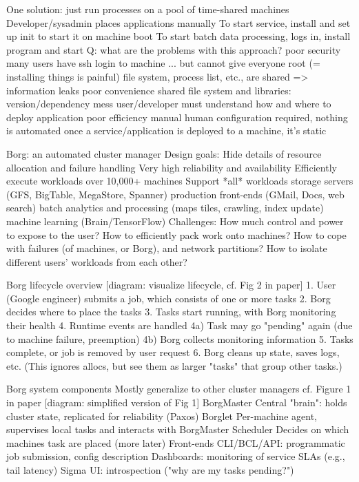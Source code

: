 One solution: just run processes on a pool of time-shared machines
  Developer/sysadmin places applications manually
    To start service, install and set up init to start it on machine boot
    To start batch data processing, logs in, install program and start
  Q: what are the problems with this approach?
    poor security
      many users have ssh login to machine
      ... but cannot give everyone root (= installing things is painful)
      file system, process list, etc., are shared => information leaks
    poor convenience
      shared file system and libraries: version/dependency mess
      user/developer must understand how and where to deploy application
    poor efficiency
      manual human configuration required, nothing is automated
      once a service/application is deployed to a machine, it's static

Borg: an automated cluster manager
  Design goals:
    Hide details of resource allocation and failure handling
    Very high reliability and availability
    Efficiently execute workloads over 10,000+ machines
    Support *all* workloads
      storage servers (GFS, BigTable, MegaStore, Spanner)
      production front-ends (GMail, Docs, web search)
      batch analytics and processing (maps tiles, crawling, index update)
      machine learning (Brain/TensorFlow)
  Challenges:
    How much control and power to expose to the user?
    How to efficiently pack work onto machines?
    How to cope with failures (of machines, or Borg), and network partitions?
    How to isolate different users' workloads from each other?

Borg lifecycle overview
  [diagram: visualize lifecycle, cf. Fig 2 in paper]
  1. User (Google engineer) submits a job, which consists of one or more tasks
  2. Borg decides where to place the tasks
  3. Tasks start running, with Borg monitoring their health
  4. Runtime events are handled
    4a) Task may go "pending" again (due to machine failure, preemption)
    4b) Borg collects monitoring information
  5. Tasks complete, or job is removed by user request
  6. Borg cleans up state, saves logs, etc.
  (This ignores allocs, but see them as larger "tasks" that group other tasks.)

Borg system components
  Mostly generalize to other cluster managers
  cf. Figure 1 in paper
  [diagram: simplified version of Fig 1]
  BorgMaster
    Central "brain": holds cluster state, replicated for reliability (Paxos)
  Borglet
    Per-machine agent, supervises local tasks and interacts with BorgMaster
  Scheduler
    Decides on which machines task are placed (more later)
  Front-ends
    CLI/BCL/API: programmatic job submission, config description
    Dashboards: monitoring of service SLAs (e.g., tail latency)
    Sigma UI: introspection ("why are my tasks pending?")

